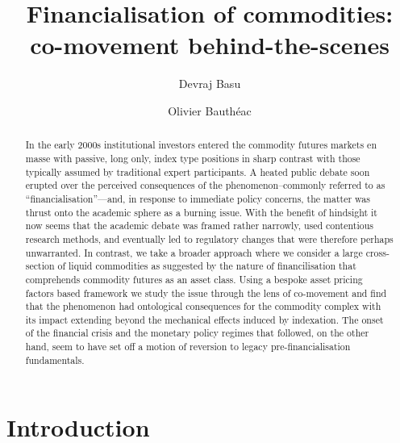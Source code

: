 \documentclass[]{elsarticle} %
\begin{document}
\begin{frontmatter}

  \title{Financialisation of commodities: co-movement behind-the-scenes}
    \author[strath]{Devraj Basu}
    \author[strath]{Olivier Bauthéac}
  
      \address[strath]{University of Strathclyde Business school}
  
  \begin{abstract}
  In the early 2000s institutional investors entered the commodity futures markets en masse with passive, long only, index type positions in sharp contrast with those typically assumed by traditional expert participants. A heated public debate soon erupted over the perceived consequences of the phenomenon--commonly referred to as ``financialisation''---and, in response to immediate policy concerns, the matter was thrust onto the academic sphere as a burning issue. With the benefit of hindsight it now seems that the academic debate was framed rather narrowly, used contentious research methods, and eventually led to regulatory changes that were therefore perhaps unwarranted. In contrast, we take a broader approach where we consider a large cross-section of liquid commodities as suggested by the nature of financilisation that comprehends commodity futures as an asset class. Using a bespoke asset pricing factors based framework we study the issue through the lens of co-movement and find that the phenomenon had ontological consequences for the commodity complex with its impact extending beyond the mechanical effects induced by indexation. The onset of the financial crisis and the monetary policy regimes that followed, on the other hand, seem to have set off a motion of reversion to legacy pre-financialisation fundamentals.
  \end{abstract}
  
 \end{frontmatter}

\restoregeometry

\cleardoublepage

\hypertarget{index}{%
\section{Introduction}\label{index}}
\end{document}
